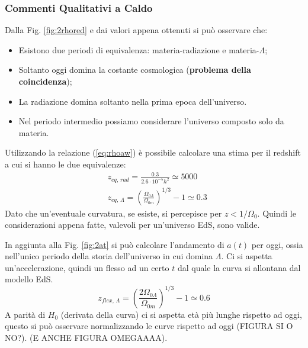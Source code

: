 \subsubsection{Commenti Qualitativi a Caldo}
Dalla Fig. \ref{fig:2rhored} e dai valori appena ottenuti si può osservare che:
\begin{itemize}
    \item Esistono due periodi di equivalenza: materia-radiazione e materia-$\Lambda$;
    \item Soltanto oggi domina la costante cosmologica (\textbf{problema della coincidenza});
    \item La radiazione domina soltanto nella prima epoca dell'universo.
    \item Nel periodo intermedio possiamo considerare l'universo composto solo da materia.
\end{itemize}

Utilizzando la relazione (\ref{eq:rhoaw}) è possibile calcolare una stima per il redshift a cui si hanno le due equivalenze:
\begin{align}
  & z_{eq,\, rad}=\frac{0.3}{2.6\cdot 10^{-5}h^2} \simeq 5000  \\
  & z_{eq,\, \Lambda}= \left ( \frac{\Omega_{0\Lambda}}{\Omega_{0m}} \right) ^{1/3} -1 \simeq 0.3  
\end{align}
Dato che un'eventuale curvatura, se esiste, si percepisce per $z<1/\Omega_0$. Quindi le considerazioni appena fatte, valevoli per un'universo EdS, sono valide.

In aggiunta alla Fig. \ref{fig:2at} si può calcolare l'andamento di $a(t)$ per oggi, ossia nell'unico periodo della storia dell'universo in cui domina $\Lambda$. Ci si aspetta un'accelerazione, quindi un flesso ad un certo $t$ dal quale la curva si allontana dal modello EdS.
\begin{equation}
    z_{flex,\, \Lambda}= \left ( \frac{2 \Omega_{0\Lambda}}{\Omega_{0m}} \right) ^{1/3} -1 \simeq 0.6 
\end{equation}
A parità di $H_0$ (derivata della curva) ci si aspetta età più lunghe rispetto ad oggi, questo si può osservare normalizzando le curve rispetto ad oggi (FIGURA SI O NO?).
(E ANCHE FIGURA OMEGAAAA).

